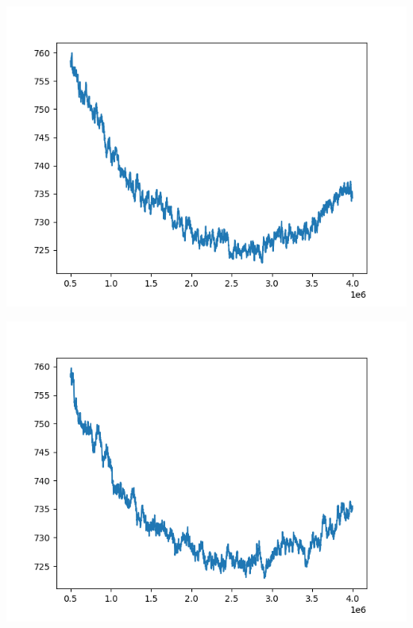 \documentclass{article}
\begin{document}
\begin{enumerate}[label=\arabic*.]
\begin{minipage}{0.4\linewidth}
            \includegraphics[width=\linewidth]{../starter_code/figs/sgd_k70.png}
        \end{minipage}\hfill
        \begin{minipage}{0.4\linewidth}
            \includegraphics[width=\linewidth]{../starter_code/figs/sgd_k80.png}
        \end{minipage}\hfill
        \begin{minipage}{0.4\linewidth}

\end{minipage}
\end{enumerate}
\end{document}
